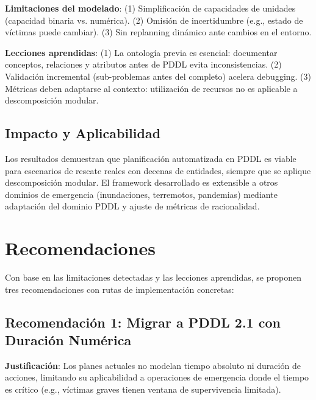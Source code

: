 \documentclass[conference]{IEEEtran}
\begin{document}
    \textbf{Limitaciones del modelado}: (1) Simplificación de capacidades de unidades (capacidad binaria vs. numérica). (2) Omisión de incertidumbre (e.g., estado de víctimas puede cambiar). (3) Sin replanning dinámico ante cambios en el entorno.

    \textbf{Lecciones aprendidas}: (1) La ontología previa es esencial: documentar conceptos, relaciones y atributos antes de PDDL evita inconsistencias. (2) Validación incremental (sub-problemas antes del completo) acelera debugging. (3) Métricas deben adaptarse al contexto: utilización de recursos no es aplicable a descomposición modular.

    \subsection{Impacto y Aplicabilidad}

    Los resultados demuestran que planificación automatizada en PDDL es viable para escenarios de rescate reales con decenas de entidades, siempre que se aplique descomposición modular. El framework desarrollado es extensible a otros dominios de emergencia (inundaciones, terremotos, pandemias) mediante adaptación del dominio PDDL y ajuste de métricas de racionalidad.

    \section{Recomendaciones}

    Con base en las limitaciones detectadas y las lecciones aprendidas, se proponen tres recomendaciones con rutas de implementación concretas:

    \subsection{Recomendación 1: Migrar a PDDL 2.1 con Duración Numérica}

    \textbf{Justificación}: Los planes actuales no modelan tiempo absoluto ni duración de acciones, limitando su aplicabilidad a operaciones de emergencia donde el tiempo es crítico (e.g., víctimas graves tienen ventana de supervivencia limitada).
\end{document}
